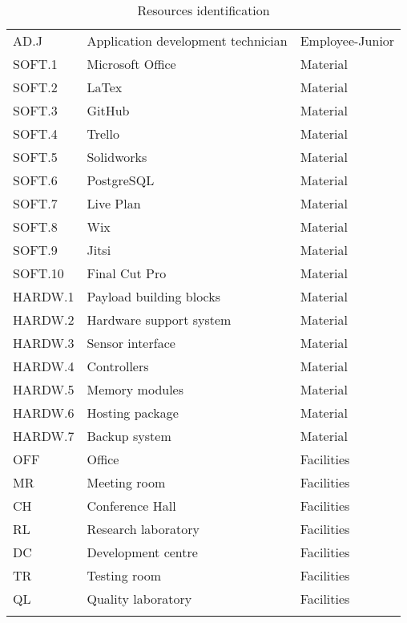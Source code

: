 \begin{longtable}{lll}
AD.J&Application development technician&Employee-Junior\\
SOFT.1&Microsoft Office&Material\\
SOFT.2&LaTex&Material\\
SOFT.3&GitHub&Material\\
SOFT.4&Trello&Material\\
SOFT.5&Solidworks&Material\\
SOFT.6&PostgreSQL&Material\\
SOFT.7&Live Plan&Material\\
SOFT.8&Wix&Material\\
SOFT.9&Jitsi&Material\\
SOFT.10&Final Cut Pro&Material\\
HARDW.1&Payload building blocks&Material\\
HARDW.2&Hardware support system&Material\\
HARDW.3&Sensor interface&Material\\
HARDW.4&Controllers&Material\\
HARDW.5&Memory modules&Material\\
HARDW.6&Hosting package&Material\\
HARDW.7&Backup system&Material\\
OFF& Office & Facilities\\
MR& Meeting room& Facilities\\
CH& Conference Hall& Facilities\\
RL & Research laboratory & Facilities\\
DC & Development centre & Facilities\\
TR& Testing room & Facilities\\
QL& Quality laboratory& Facilities\\


\bottomrule[2pt]

\caption{Resources identification}
\label{table_resourcesidentification}	
\end{longtable}

